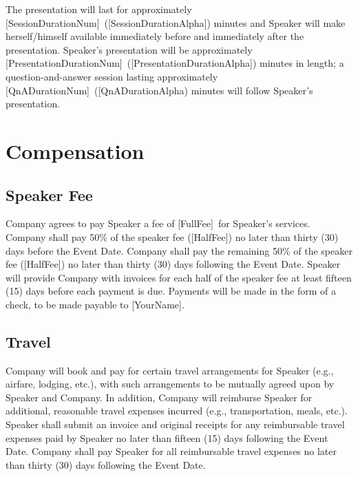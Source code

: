 \documentclass[a4paper,12pt]{article} %
\newcommand{\YourName}{[YourName]}
\newcommand{\FullFee}{[FullFee]}
\newcommand{\HalfFee}{[HalfFee]}
\newcommand{\SessionDurationNum}{[SessionDurationNum]}
\newcommand{\SessionDurationAlpha}{[SessionDurationAlpha]}
\newcommand{\PresentationDurationNum}{[PresentationDurationNum]}
\newcommand{\PresentationDurationAlpha}{[PresentationDurationAlpha]}
\newcommand{\QnADurationNum}{[QnADurationNum]}
\newcommand{\QnADurationAlpha}{[QnADurationAlpha}
\begin{document}
The presentation will last for approximately \SessionDurationNum ~(\SessionDurationAlpha) minutes and Speaker will make herself/himself available immediately before and immediately after the presentation. Speaker's presentation will be approximately \PresentationDurationNum ~(\PresentationDurationAlpha) minutes in length; a question-and-answer session lasting approximately \QnADurationNum ~(\QnADurationAlpha) minutes will follow Speaker's presentation.



\section{Compensation}

\subsection{Speaker Fee}

Company agrees to pay Speaker a fee of \FullFee ~for Speaker's services. Company shall pay 50\% of the speaker fee (\HalfFee) no later than thirty (30) days before the Event Date. Company shall pay the remaining 50\% of the speaker fee (\HalfFee) no later than thirty (30) days following the Event Date. Speaker will provide Company with invoices for each half of the speaker fee at least fifteen (15) days before each payment is due. Payments will be made in the form of a check, to be made payable to \YourName.

\subsection{Travel}

Company will book and pay for certain travel arrangements for Speaker (e.g., airfare, lodging, etc.), with such arrangements to be mutually agreed upon by Speaker and Company. In addition, Company will reimburse Speaker for additional, reasonable travel expenses incurred (e.g., transportation, meals, etc.). Speaker shall submit an invoice and original receipts for any reimbursable travel expenses paid by Speaker no later than fifteen (15) days following the Event Date. Company shall pay Speaker for all reimbursable travel expenses no later than thirty (30) days following the Event Date.
\end{document}
